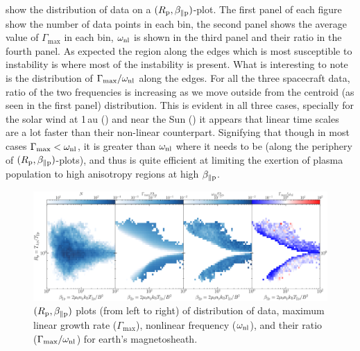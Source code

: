          show the distribution of data on a $(R_{\rm
        p}, \beta_{\parallel \rm p})$-plot. The first panel of each figure show the number of data
        points in each bin, the second panel shows the average value of $\Gamma_{\max}$ in each bin,
        $\omega_{\rm nl}$ is shown in the third panel and their ratio in the fourth panel. As
        expected the region along the edges which is most susceptible to instability is where most
        of the instability is present. What is interesting to note is the distribution of
        $\Gamma_{\max}/\omega_{\rm nl}$ along the edges. For all the three spacecraft data, ratio of
        the two frequencies is increasing as we move outside from the centroid (as seen in the first
        panel) distribution. This is evident in all three cases, specially for the solar wind at
        1\,au () and near the Sun () it appears that
        linear time scales are a lot faster than their non-linear counterpart. Signifying that
        though in most cases $\Gamma_{\max} < \omega_{\rm nl}$, it is greater than $\omega_{\rm nl}$
        where it needs to be (along the periphery of $(R_{\rm p}, \beta_{\parallel \rm p})$-plots),
        and thus is quite efficient at limiting the exertion of plasma population to high anisotropy
        regions at high $\beta_{\parallel \rm p}$.

            \begin{figure}
                \begin{center}
                    \includegraphics[width=1.\textwidth]{figures/chap7/mms_brz_omega_gamma_mean.pdf}
                    \caption[$(R_{\rm p}, \beta_{\parallel \rm p})$-plot of $\Gamma_{\max}$,
                    $\omega_{\rm nl}$ and $\Gamma_{\max}/\omega_{\rm nl}$ for \texttt{mms}
                    dataset]{$(R_{\rm p}, \beta_{\parallel \rm p})$ plots (from left to right) of
                    distribution of data, maximum linear growth rate ($\Gamma_{\max}$), nonlinear
                    frequency ($\omega_{\rm nl}$), and their ratio ($\Gamma_{\max}/\omega_{\rm nl}$)
                    for earth's magnetosheath.}
                    \label{fig:ratio_brz_mms}
                \end{center}
            \end{figure}

